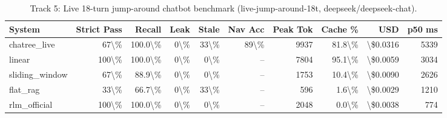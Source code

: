 \begin{table}[t]
\centering
\small
\begin{tabular}{lrrrrrrrrr}
\toprule
\textbf{System} & \textbf{Strict Pass} & \textbf{Recall} & \textbf{Leak} & \textbf{Stale} & \textbf{Nav Acc} & \textbf{Peak Tok} & \textbf{Cache \%} & \textbf{USD} & \textbf{p50 ms} \\
\midrule
chatree\_live & 67\textbackslash{}\% & 100.0\textbackslash{}\% & 0\textbackslash{}\% & 33\textbackslash{}\% & 89\textbackslash{}\% & 9937 & 81.8\textbackslash{}\% & \textbackslash{}\$0.0316 & 5339 \\
linear & 100\textbackslash{}\% & 100.0\textbackslash{}\% & 0\textbackslash{}\% & 0\textbackslash{}\% & -- & 7804 & 95.1\textbackslash{}\% & \textbackslash{}\$0.0059 & 3034 \\
sliding\_window & 67\textbackslash{}\% & 88.9\textbackslash{}\% & 0\textbackslash{}\% & 0\textbackslash{}\% & -- & 1753 & 10.4\textbackslash{}\% & \textbackslash{}\$0.0090 & 2626 \\
flat\_rag & 33\textbackslash{}\% & 66.7\textbackslash{}\% & 0\textbackslash{}\% & 33\textbackslash{}\% & -- & 596 & 1.6\textbackslash{}\% & \textbackslash{}\$0.0029 & 1210 \\
rlm\_official & 100\textbackslash{}\% & 100.0\textbackslash{}\% & 0\textbackslash{}\% & 0\textbackslash{}\% & -- & 2048 & 0.0\textbackslash{}\% & \textbackslash{}\$0.0038 & 774 \\
\bottomrule
\end{tabular}
\caption{Track 5: Live 18-turn jump-around chatbot benchmark (live-jump-around-18t, deepseek/deepseek-chat).}
\label{tab:jump_around_live}
\end{table}
